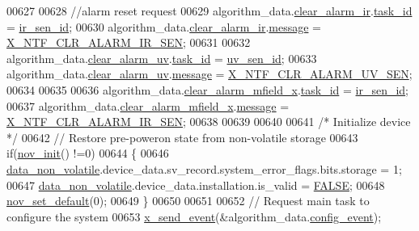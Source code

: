 \begin{DoxyCode}
{{{{{00627 
00628     \textcolor{comment}{//alarm reset request}
00629     algorithm\_data.\hyperlink{a00016_a5ef7ebf1a1e20f770d46232ab2be8312}{clear\_alarm\_ir}.\hyperlink{a00036_a21b41e494a28583d4da10f1afb1c5328}{task\_id}                    = 
      \hyperlink{a00017_a624782f67b3870f0dde83528770ef5fc}{ir\_sen\_id};
00630     algorithm\_data.\hyperlink{a00016_a5ef7ebf1a1e20f770d46232ab2be8312}{clear\_alarm\_ir}.\hyperlink{a00036_adf9665938515a20c283eea2c978cf80d}{message}                    = 
      \hyperlink{a00021_a55be0f14bd98010fdd4ff546f8cffefd}{X\_NTF\_CLR\_ALARM\_IR\_SEN};
00631 
00632     algorithm\_data.\hyperlink{a00016_a5d8e57dd19de326e75625a8704cfceee}{clear\_alarm\_uv}.\hyperlink{a00036_a21b41e494a28583d4da10f1afb1c5328}{task\_id}                    = 
      \hyperlink{a00020_afd789f3f9ea182d28d4f16db0d8d5652}{uv\_sen\_id};
00633     algorithm\_data.\hyperlink{a00016_a5d8e57dd19de326e75625a8704cfceee}{clear\_alarm\_uv}.\hyperlink{a00036_adf9665938515a20c283eea2c978cf80d}{message}                    = 
      \hyperlink{a00021_a1127762abb3a1aeb79d23421b2f00493}{X\_NTF\_CLR\_ALARM\_UV\_SEN};
00634 
00635 
00636     algorithm\_data.\hyperlink{a00016_a57101a48bdde96a0db1ec63892095f7c}{clear\_alarm\_mfield\_x}.\hyperlink{a00036_a21b41e494a28583d4da10f1afb1c5328}{task\_id}              = 
      \hyperlink{a00017_a624782f67b3870f0dde83528770ef5fc}{ir\_sen\_id};
00637     algorithm\_data.\hyperlink{a00016_a57101a48bdde96a0db1ec63892095f7c}{clear\_alarm\_mfield\_x}.\hyperlink{a00036_adf9665938515a20c283eea2c978cf80d}{message}              = 
      \hyperlink{a00021_a55be0f14bd98010fdd4ff546f8cffefd}{X\_NTF\_CLR\_ALARM\_IR\_SEN};
00638 
00639 
00640     
00641     \textcolor{comment}{/* Initialize device */}
00642     \textcolor{comment}{// Restore pre-poweron state from non-volatile storage    }
00643     \textcolor{keywordflow}{if}(\hyperlink{a00029_a8ad2f815848f1668763c01ff9d45a01b}{nov\_init}() !=0)
00644     \{
00646         \hyperlink{a00060_a76ac5f917f5308dcd83de0d7c94559fb}{data\_non\_volatile}.device\_data.sv\_record.system\_error\_flags.bits.storage = 1;
00647         \hyperlink{a00060_a76ac5f917f5308dcd83de0d7c94559fb}{data\_non\_volatile}.device\_data.installation.is\_valid = 
      \hyperlink{a00040_aa93f0eb578d23995850d61f7d61c55c1}{FALSE};
00648         \hyperlink{a00029_ada4ee53cb163a9ed3e2b4a5c7192690a}{nov\_set\_default}(0);
00649     \}
00650       
00651 
00652     \textcolor{comment}{// Request main task to configure the system}
00653     \hyperlink{a00036_a4bc3d03c8d62c8237329ed4e969fbc1b}{x\_send\_event}(&algorithm\_data.\hyperlink{a00016_a461881ff0583945fd26ee6d5faf8ce1b}{config\_event});
}}}}}
\end{DoxyCode}
